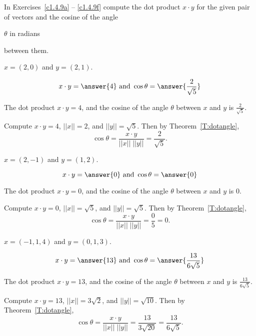 \documentclass{ximera}
\begin{document}
\noindent In Exercises~\ref{c1.4.9a} -- \ref{c1.4.9f}
compute the dot product $x\cdot y$ for the given pair of vectors and 
the cosine of the angle \begin{prompt}$\theta$ in radians\end{prompt} between them.
\begin{exercise} \label{c1.4.9a}
  $x=(2,0)$ and $y=(2,1)$.
  \begin{prompt}
    \[x \cdot y = \answer{4} \mbox{ and }
    \cos \theta = \answer{\frac{2}{\sqrt{5}}}\]
  \end{prompt}

\begin{solution}
\ans The dot product $x \cdot y = 4$, and the cosine
of the angle $\theta$ between $x$ and $y$ is $\frac{2}{\sqrt{5}}$.

\soln Compute $x \cdot y = 4$, $||x|| = 2$, and $||y|| = \sqrt{5}$.
Then by Theorem~\ref{T:dotangle},
\[
\cos\theta = \frac{x \cdot y}{||x||\;||y||} = \frac{2}{\sqrt{5}}.
\]

\end{solution}
\end{exercise}
\begin{exercise} \label{c1.4.9b}
  $x=(2,-1)$ and $y=(1,2)$.
    \begin{prompt}
    \[x \cdot y = \answer{0} \mbox{ and }
    \cos \theta = \answer{0}\]
  \end{prompt}

\begin{solution}
\ans The dot product $x \cdot y = 0$, and the cosine
of the angle $\theta$ between $x$ and $y$ is $0$.

\soln Compute $x \cdot y = 0$, $||x|| = \sqrt{5}$, and $||y|| = \sqrt{5}$.
Then by Theorem~\ref{T:dotangle},
\[
\cos\theta = \frac{x \cdot y}{||x||\;||y||} = \frac{0}{5}
= 0.
\]

\end{solution}
\end{exercise}
\begin{exercise} \label{c1.4.9c}
  $x=(-1,1,4)$ and $y=(0,1,3)$.
  \begin{prompt}
    \[x \cdot y = \answer{13} \mbox{ and }
    \cos \theta = \answer{\frac{13}{6\sqrt{5}}}\]
  \end{prompt}

\begin{solution}
\ans The dot product $x \cdot y = 13$, and the cosine
of the angle $\theta$ between $x$ and $y$ is $\frac{13}{6\sqrt{5}}$.

\soln Compute $x \cdot y = 13$, $||x|| = 3\sqrt{2}$, and $||y|| = \sqrt{10}$.
Then by Theorem~\ref{T:dotangle},
\[
\cos\theta = \frac{x \cdot y}{||x||\;||y||} = \frac{13}{3\sqrt{20}}
= \frac{13}{6\sqrt{5}}.
\]

\end{solution}
\end{exercise}
\end{document}
